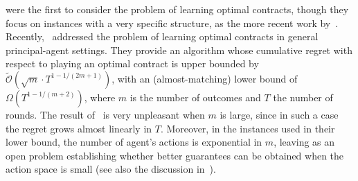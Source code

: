 \citet{ho2015adaptive} were the first to consider the problem of learning optimal contracts, though they focus on instances with a very specific structure, as the more recent work by~\citet{cohen2022learning}.
%
Recently,~\citet{zhu2022sample} addressed the problem of learning optimal contracts in general principal-agent settings. %
%
They provide an algorithm whose cumulative regret with respect to playing an optimal contract is upper bounded by $\widetilde{\mathcal{O}}(\sqrt{m} \cdot T^{1-1/(2m+1)})$, with an (almost-matching) lower bound of $\Omega(T^{1-1/(m+2)})$, where $m$ is the number of outcomes and $T$ the number of rounds.
%
The result of~\citet{zhu2022sample} is very unpleasant when $m$ is large, since in such a case the regret grows almost linearly in $T$.
%
Moreover, in the instances used in their lower bound, the number of agent's actions is exponential in $m$, leaving as an open problem establishing whether better guarantees can be obtained when the action space is small (see also the discussion in~\citep{zhu2022sample}).


